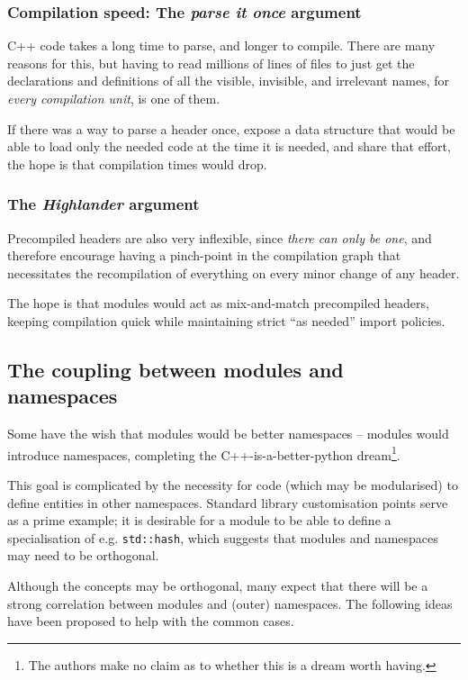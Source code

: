 \documentclass[reqno]{article}
\begin{document}
\subsubsection{Compilation speed: The \emph{parse it once} argument}

C++ code takes a long time to parse, and longer to compile. There are many
reasons for this, but having to read millions of lines of files to just get the
declarations and definitions of all the visible, invisible, and irrelevant
names, for \emph{every compilation unit}, is one of them.

If there was a way to parse a header once, expose a data structure that would be
able to load only the needed code at the time it is needed, and share that
effort, the hope is that compilation times would drop.


\subsubsection{The \emph{Highlander} argument}

Precompiled headers are also very inflexible, since \emph{there can only be
one}, and therefore encourage having a pinch-point in the compilation graph
that necessitates the recompilation of everything on every minor change of any
header.

The hope is that modules would act as mix-and-match precompiled headers,
keeping compilation quick while maintaining strict ``as needed'' import policies.


\subsection{The coupling between modules and namespaces}

Some have the wish that modules would be better namespaces -- modules would
introduce namespaces, completing the C++-is-a-better-python dream\footnote{The
authors make no claim as to whether this is a dream worth having.}.

This goal is complicated by the necessity for code (which may be modularised)
to define entities in other namespaces. Standard library customisation points
serve as a prime example; it is desirable for a module to be able to define a
specialisation of e.g. \texttt{std::hash}, which suggests that modules and
namespaces may need to be orthogonal.

Although the concepts may be orthogonal, many expect that there will be a
strong correlation between modules and (outer) namespaces. The following ideas
have been proposed to help with the common cases.
\end{document}
